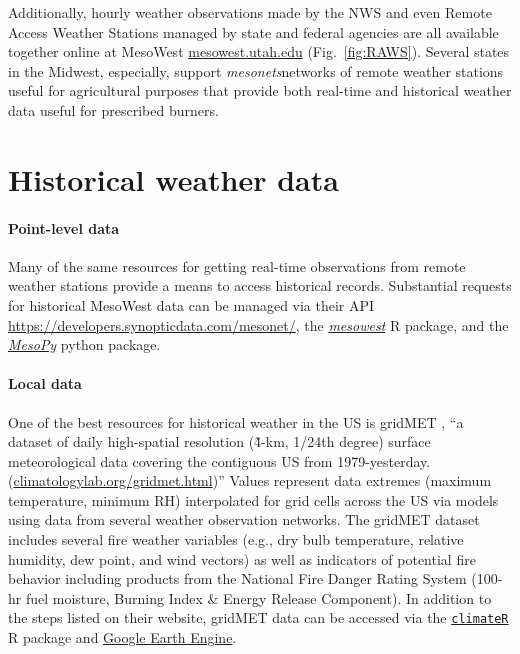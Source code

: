 Additionally, hourly weather observations made by the NWS and even Remote Access Weather Stations managed by state and federal agencies are all available together online at MesoWest \href{https://mesowest.utah.edu/}{mesowest.utah.edu} (Fig.~\ref{fig:RAWS}).
Several states in the Midwest, especially, support \emph{mesonets}\textemdash networks of remote weather stations useful for agricultural purposes that provide both real-time and historical weather data useful for prescribed burners.  


\section{Historical weather data}



\paragraph{Point-level data} 

Many of the same resources for getting real-time observations from remote weather stations provide a means to access historical records. 
Substantial requests for historical MesoWest data can be managed via their API \href{https://developers.synopticdata.com/mesonet/}{https://developers.synopticdata.com/mesonet/}, the \href{https://github.com/fickse/mesowest}{\emph{mesowest}} R package, and the \href{https://github.com/mesowx/MesoPy}{\emph{MesoPy}} python package.

\paragraph{Local data}

One of the best resources for historical weather in the US is gridMET \citep{abatzoglou2013}, ``a dataset of daily high-spatial resolution (\~4-km, 1/24th degree) surface meteorological data covering the contiguous US from 1979-yesterday. (\href{https://www.climatologylab.org/gridmet.html}{climatologylab.org/gridmet.html})''
Values represent data extremes (maximum temperature, minimum RH) interpolated for grid cells across the US via models using data from several weather observation networks. 
The gridMET dataset includes several fire weather variables (e.g., dry bulb temperature, relative humidity, dew point, and wind vectors) as well as indicators of potential fire behavior including products from the National Fire Danger Rating System (100-hr fuel moisture, Burning Index \& Energy Release Component). 
In addition to the steps listed on their website, gridMET data can be accessed via the \href{https://github.com/mikejohnson51/climateR/}{\texttt{climateR}} R package  and \href{https://explorer.earthengine.google.com/#detail/IDAHO\_EPSCOR\%2FGRIDMET}{Google Earth Engine}. 
